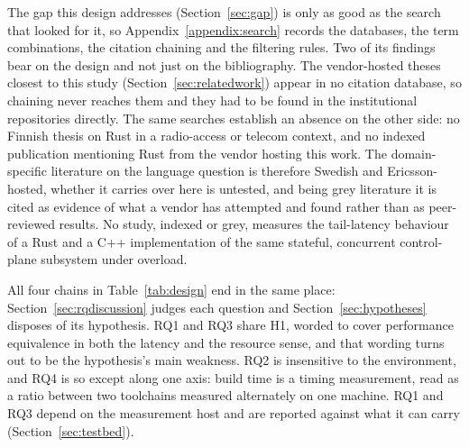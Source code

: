 The gap this design addresses (Section~\ref{sec:gap}) is only as good as the search that looked
for it, so Appendix~\ref{appendix:search} records the databases, the term combinations, the
citation chaining and the filtering rules. Two of its findings bear on the design and not just
on the bibliography. The vendor-hosted theses closest to this study
(Section~\ref{sec:relatedwork}) appear in no citation database, so chaining never reaches them
and they had to be found in the institutional repositories directly. The same searches establish
an absence on the other side: no Finnish thesis on Rust in a radio-access or telecom context, and
no indexed publication mentioning Rust from the vendor hosting this work. The domain-specific
literature on the language question is therefore Swedish and Ericsson-hosted, whether it carries
over here is untested, and being grey literature it is cited as evidence of what a vendor has
attempted and found rather than as peer-reviewed results. No study, indexed or grey, measures
the tail-latency behaviour of a Rust and a C++ implementation of the same stateful, concurrent
control-plane subsystem under overload.

All four chains in Table~\ref{tab:design} end in the same place: Section~\ref{sec:rqdiscussion}
judges each question and Section~\ref{sec:hypotheses} disposes of its hypothesis. RQ1 and RQ3
share H1,
worded to cover performance equivalence in both the latency and the resource sense, and that
wording turns out to be the hypothesis's main weakness. RQ2 is insensitive to the environment,
and RQ4 is so except along one axis: build time is a timing measurement, read as a ratio between
two toolchains measured alternately on one machine. RQ1 and RQ3 depend on the measurement host
and are reported against what it can carry (Section~\ref{sec:testbed}).


